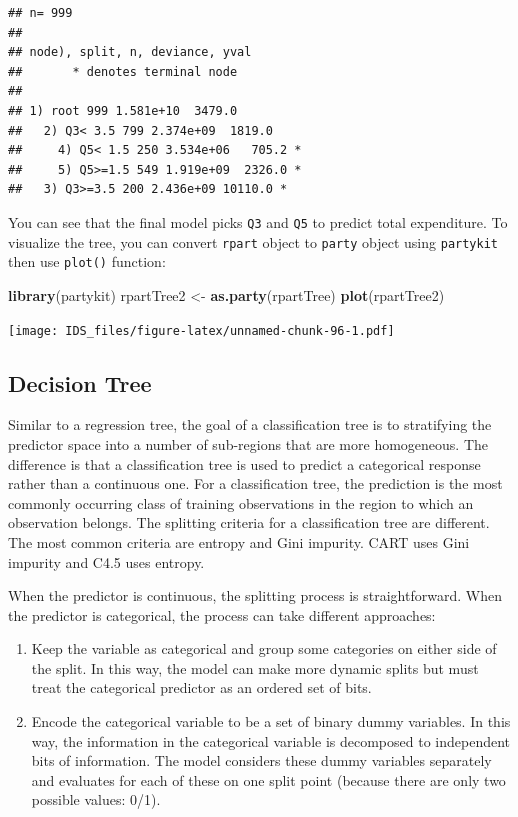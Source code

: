 \documentclass[12pt,]{krantz}
\makeatletter
\newenvironment{Shaded}{\begin{snugshade}}{\end{snugshade}}
\newcommand{\KeywordTok}[1]{\textcolor[rgb]{0.27,0.27,0.27}{\textbf{#1}}}
\newcommand{\NormalTok}[1]{#1}
\newcommand{\StringTok}[1]{\textcolor[rgb]{0.5,0.5,0.5}{#1}}
\providecommand{\tightlist}{%
  \setlength{\itemsep}{0pt}\setlength{\parskip}{0pt}}
\newenvironment{kframe}{%
\medskip{}
\setlength{\fboxsep}{.8em}
 \def\at@end@of@kframe{}%
 \ifinner\ifhmode%
  \def\at@end@of@kframe{\end{minipage}}%
  \begin{minipage}{\columnwidth}%
 \fi\fi%
 \def\FrameCommand##1{\hskip\@totalleftmargin \hskip-\fboxsep
 \colorbox{shadecolor}{##1}\hskip-\fboxsep
     \hskip-\linewidth \hskip-\@totalleftmargin \hskip\columnwidth}%
 \MakeFramed {\advance\hsize-\width
   \@totalleftmargin\z@ \linewidth\hsize
   \@setminipage}}%
 {\par\unskip\endMakeFramed%
 \at@end@of@kframe}
\renewenvironment{Shaded}{\begin{kframe}}{\end{kframe}}
\makeatother
\begin{document}
\begin{verbatim}
## n= 999 
## 
## node), split, n, deviance, yval
##       * denotes terminal node
## 
## 1) root 999 1.581e+10  3479.0  
##   2) Q3< 3.5 799 2.374e+09  1819.0  
##     4) Q5< 1.5 250 3.534e+06   705.2 *
##     5) Q5>=1.5 549 1.919e+09  2326.0 *
##   3) Q3>=3.5 200 2.436e+09 10110.0 *
\end{verbatim}

You can see that the final model picks \texttt{Q3} and \texttt{Q5} to predict total expenditure. To visualize the tree, you can convert \texttt{rpart} object to \texttt{party} object using \texttt{partykit} then use \texttt{plot()} function:

\begin{Shaded}
\begin{Highlighting}[]
\KeywordTok{library}\NormalTok{(partykit)}
\NormalTok{rpartTree2 <-}\StringTok{ }\KeywordTok{as.party}\NormalTok{(rpartTree)}
\KeywordTok{plot}\NormalTok{(rpartTree2)}
\end{Highlighting}
\end{Shaded}

\texttt{[image: IDS\_files/figure-latex/unnamed-chunk-96-1.pdf]}

\hypertarget{decision-tree}{%
\subsection{Decision Tree}\label{decision-tree}}

Similar to a regression tree, the goal of a classification tree is to stratifying the predictor space into a number of sub-regions that are more homogeneous. The difference is that a classification tree is used to predict a categorical response rather than a continuous one. For a classification tree, the prediction is the most commonly occurring class of training observations in the region to which an observation belongs. The splitting criteria for a classification tree are different. The most common criteria are entropy and Gini impurity. CART uses Gini impurity and C4.5 uses entropy.

When the predictor is continuous, the splitting process is straightforward. When the predictor is categorical, the process can take different approaches:

\begin{enumerate}
\def\labelenumi{\arabic{enumi}.}
\tightlist
\item
  Keep the variable as categorical and group some categories on either side of the split. In this way, the model can make more dynamic splits but must treat the categorical predictor as an ordered set of bits.
\item
  Encode the categorical variable to be a set of binary dummy variables. In this way, the information in the categorical variable is decomposed to independent bits of information. The model considers these dummy variables separately and evaluates for each of these on one split point (because there are only two possible values: 0/1).
\end{enumerate}
\end{document}

